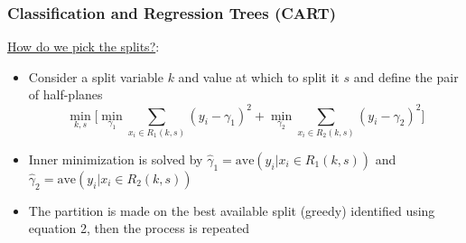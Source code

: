 \documentclass{beamer}
\begin{document}
\begin{frame}

    \frametitle{Classification and Regression Trees (CART)}
    
    \footnotesize
    \underline{How do we pick the splits?}:
    \medskip

        \begin{itemize}
            \item Consider a split variable $k$ and value at which to split it $s$
                  and define the pair of half-planes
                  \begin{equation}
                    \underset{k,s}{\operatorname{min}} \Bigg[
                        \underset{\gamma_1}{\operatorname{min}}
                        \sum_{x_i \in R_1(k,s)} (y_i-\gamma_1)^2 +
                        \underset{\gamma_2}{\operatorname{min}}
                        \sum_{x_i \in R_2(k,s)} (y_i-\gamma_2)^2\Bigg]
                  \end{equation}
            \item Inner minimization is solved by 
                  $\hat{\gamma}_1 = \text{ave}(y_i|x_i \in R_1(k,s))$ and
                  $\hat{\gamma}_2 = \text{ave}(y_i|x_i \in R_2(k,s))$
            \item The partition is made on the best available split (greedy) 
                  identified using equation 2, then the process is repeated 
        \end{itemize}
        
%        
%    
        
\end{frame}


\end{document}

